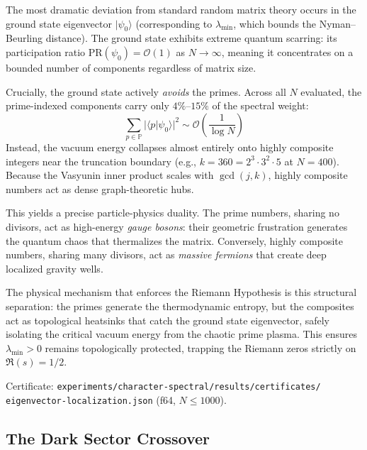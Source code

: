\documentclass[11pt,a4paper]{article}
\begin{document}
\begin{correspondence}
\label{corr:scarring}
The most dramatic deviation from standard random matrix theory occurs in
the ground state eigenvector $|\psi_0\rangle$ (corresponding to
$\lambda_{\min}$, which bounds the Nyman--Beurling distance). The ground
state exhibits extreme quantum scarring: its participation ratio
$\mathrm{PR}(\psi_0) = \mathcal{O}(1)$ as $N \to \infty$, meaning it
concentrates on a bounded number of components regardless of matrix size.

Crucially, the ground state actively \emph{avoids} the primes. Across
all $N$ evaluated, the prime-indexed components carry only $4\%$--$15\%$
of the spectral weight:
\begin{equation}
  \sum_{p \in \mathbb{P}} |\langle p | \psi_0 \rangle|^2
  \sim \mathcal{O}\left(\frac{1}{\log N}\right)
  \label{eq:prime-avoidance}
\end{equation}
Instead, the vacuum energy collapses almost entirely onto highly composite
integers near the truncation boundary (e.g., $k = 360 = 2^3 \cdot 3^2 \cdot 5$
at $N = 400$). Because the Vasyunin inner product scales with
$\gcd(j,k)$, highly composite numbers act as dense graph-theoretic hubs.

This yields a precise particle-physics duality. The prime numbers,
sharing no divisors, act as high-energy \emph{gauge bosons}: their
geometric frustration generates the quantum chaos that thermalizes the
matrix. Conversely, highly composite numbers, sharing many divisors,
act as \emph{massive fermions} that create deep localized gravity wells.

The physical mechanism that enforces the Riemann Hypothesis is this
structural separation: the primes generate the thermodynamic entropy,
but the composites act as topological heatsinks that catch the ground
state eigenvector, safely isolating the critical vacuum energy from the
chaotic prime plasma. This ensures $\lambda_{\min} > 0$ remains
topologically protected, trapping the Riemann zeros strictly on
$\Re(s) = 1/2$.

Certificate: \texttt{experiments/character-spectral/results/certificates/}\\
\texttt{eigenvector-localization.json} (f64, $N \leq 1000$).
\end{correspondence}

\subsection{The Dark Sector Crossover}
\label{sec:dark-sector}
\end{document}
